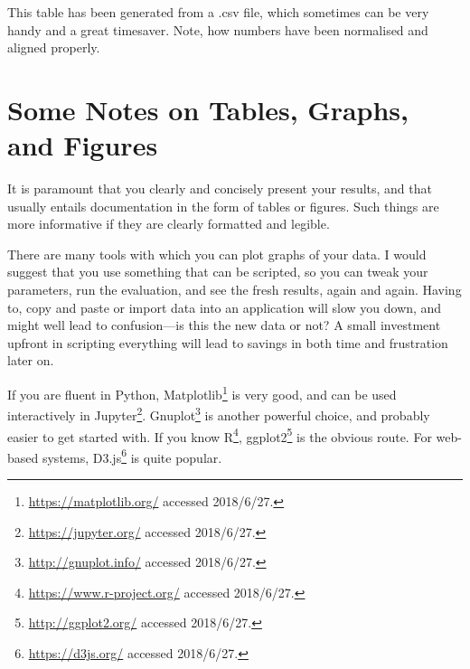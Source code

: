\begin{table}
  \myfloatalign
  \caption[An auto-generated table]{This table has been generated from a
    .csv file, which sometimes can be very handy and a great timesaver. Note, how numbers have been normalised and aligned properly.}
  \label{tab:pretty-table}
\end{table}



\section{Some Notes on Tables, Graphs, and Figures}
\label{sec:some-notes-tables}

It is paramount that you clearly and concisely present your results, and
that usually entails documentation in the form of tables or figures.  Such
things are more informative if they are clearly formatted and legible.

There are many tools with which you can plot graphs of your data. I would
suggest that you use something that can be scripted, so you can tweak your
parameters, run the evaluation, and see the fresh results, again and
again. Having to, \eg copy and paste or import data into an application will
slow you down, and might well lead to confusion---is this the new data or not?
A small investment upfront in scripting everything will lead to savings in
both time and frustration later on.

If you are fluent in Python,
Matplotlib\footnote{\url{https://matplotlib.org/} accessed 2018/6/27.} is
very good, and can be used interactively in
Jupyter\footnote{\url{https://jupyter.org/} accessed
  2018/6/27.}. Gnuplot\footnote{\url{http://gnuplot.info/} accessed
  2018/6/27.}  is another powerful choice, and probably easier to get
started with. If you know R\footnote{\url{https://www.r-project.org/}
  accessed 2018/6/27.}, ggplot2\footnote{\url{http://ggplot2.org/} accessed
  2018/6/27.} is the obvious route.  For web-based systems,
D3.js\footnote{\url{https://d3js.org/} accessed 2018/6/27.} is quite
popular.

